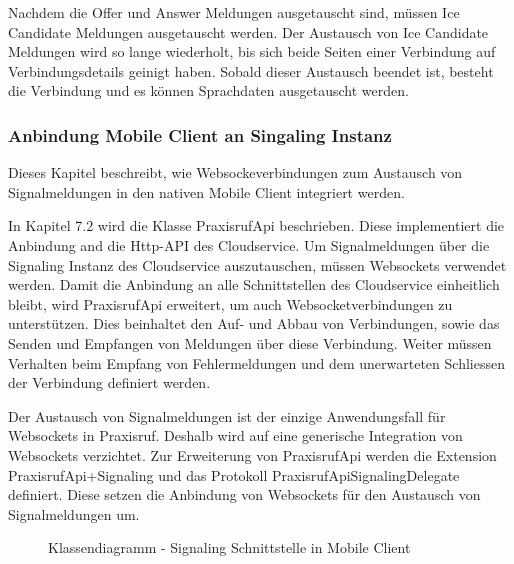 Nachdem die Offer und Answer Meldungen ausgetauscht sind, müssen Ice Candidate Meldungen ausgetauscht werden.
Der Austausch von Ice Candidate Meldungen wird so lange wiederholt, bis sich beide Seiten einer Verbindung auf Verbindungsdetails geinigt haben.
Sobald dieser Austausch beendet ist, besteht die Verbindung und es können Sprachdaten ausgetauscht werden.

\clearpage

\subsubsection{Anbindung Mobile Client an Singaling Instanz}

Dieses Kapitel beschreibt, wie Websockeverbindungen zum Austausch von Signalmeldungen in den nativen Mobile Client integriert werden.

In Kapitel 7.2 wird die Klasse PraxisrufApi beschrieben.
Diese implementiert die Anbindung and die Http-API des Cloudservice.
Um Signalmeldungen über die Signaling Instanz des Cloudservice auszutauschen, müssen Websockets verwendet werden.
Damit die Anbindung an alle Schnittstellen des Cloudservice einheitlich bleibt, wird PraxisrufApi erweitert, um auch Websocketverbindungen zu unterstützen.
Dies beinhaltet den Auf- und Abbau von Verbindungen, sowie das Senden und Empfangen von Meldungen über diese Verbindung.
Weiter müssen Verhalten beim Empfang von Fehlermeldungen und dem unerwarteten Schliessen der Verbindung definiert werden.

Der Austausch von Signalmeldungen ist der einzige Anwendungsfall für Websockets in Praxisruf.
Deshalb wird auf eine generische Integration von Websockets verzichtet.
Zur Erweiterung von PraxisrufApi werden die Extension PraxisrufApi+Signaling und das Protokoll PraxisrufApiSignalingDelegate definiert.
Diese setzen die Anbindung von Websockets für den Austausch von Signalmeldungen um.

\begin{figure}[h]
    \centering
    \begin{minipage}[b]{0.6\textwidth}
        \caption{Klassendiagramm - Signaling Schnittstelle in Mobile Client}
    \end{minipage}
\end{figure}

